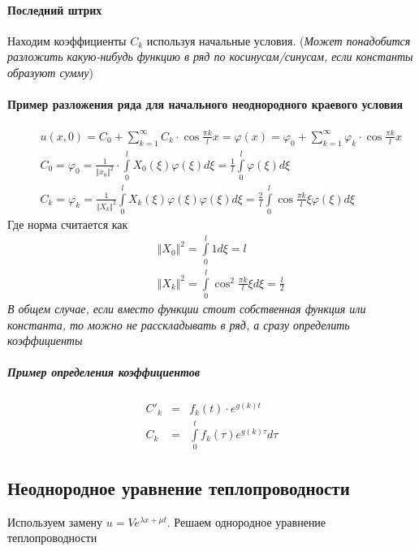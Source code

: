 \documentclass{article}[12pt]
\begin{document}
\paragraph{Последний штрих}
Находим коэффициенты $C_{k}$ используя начальные условия.
(\textit{Может понадобится разложить какую-нибудь функцию в ряд по
косинусам/синусам, если константы образуют сумму})
\paragraph{Пример разложения ряда для начального неоднородного краевого условия}
\begin{eqnarray*}
    &&u(x,0)=C_{0}+\sum\limits_{k=1}^{\infty}C_{k}\cdot\cos{\frac{\pi
    k}{l}}x
    =\varphi(x)=\varphi_{0}+\sum\limits_{k=1}^{\infty}\varphi_{k}
    \cdot\cos{\frac{\pi k}{l}}x  \\
    &&C_{0}=\varphi_{0}=\frac{1}{\Vert x_{0}\Vert^{2}}
    \cdot \int\limits_{0}^{l}X_{0}(\xi)\varphi(\xi)d\xi
    =\frac{1}{l}\int\limits_{0}^{l}\varphi(\xi)d\xi\\
    &&C_{k}=\varphi_{k}=\frac{1}{\Vert X_{k}
    \Vert^{2}}\int\limits_{0}^{l}X_{k}(\xi)\varphi(\xi)\varphi(\xi)d\xi
    =\frac{2}{l}\int\limits_{0}^{l}\cos{\frac{\pi
    k}{l}\xi}\varphi(\xi)d\xi
\end{eqnarray*}
Где норма считается как
\begin{eqnarray*}
    &&\Vert X_{0} \Vert^{2}
    =\int\limits_{0}^{l}1d\xi=l\\
    &&\Vert X_{k} \Vert^{2}
    =\int\limits_{0}^{l}\cos^{2}{\frac{\pi k}{l}}\xi d\xi =\frac{l}{2}
\end{eqnarray*}
\textit{В общем случае, если вместо функции стоит собственная функция
или константа, то можно не расскладывать в ряд, а сразу определить
коэффициенты}


\subparagraph{Пример определения коэффициентов}
\begin{eqnarray*}
    C'_{k} & = & f_{k}(t)\cdot e^{g(k)t}\\
    C_{k} & = & \int\limits_{0}^{t}f_{k}(\tau)e^{g(k)\tau}d\tau
\end{eqnarray*}


\subsection{Неоднородное уравнение теплопроводности}
Используем замену $u=Ve^{\lambda x+\mu t}$. Решаем однородное уравнение
теплопроводности
\end{document}
